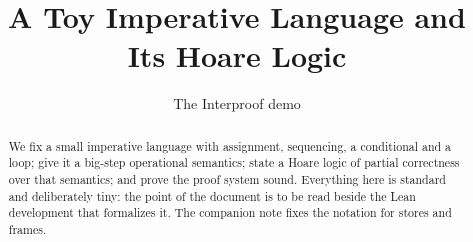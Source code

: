 \documentclass[11pt,a4paper]{article}
\title{A Toy Imperative Language and Its Hoare Logic}
\author{The Interproof demo}
\date{}
\begin{document}
\maketitle

\begin{abstract}
We fix a small imperative language with assignment, sequencing, a conditional
and a loop; give it a big-step operational semantics; state a Hoare logic of
partial correctness over that semantics; and prove the proof system sound.
Everything here is standard and deliberately tiny: the point of the document
is to be read beside the Lean development that formalizes it. The companion
note fixes the notation for stores and frames.
\end{abstract}





\end{document}
